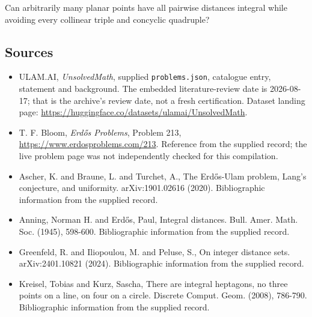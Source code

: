 \documentclass[11pt,a4paper]{article}
\begin{document}
Can arbitrarily many planar points have all pairwise distances integral while avoiding every collinear triple and concyclic quadruple?

\subsection{Sources}

{\small

\begin{itemize}

\item[\hypertarget{source:statement:1}{S1}] ULAM.AI, \emph{UnsolvedMath}, supplied \texttt{problems.json}, catalogue entry, statement and background. The embedded literature-review date is 2026-08-17; that is the archive’s review date, not a fresh certification. Dataset landing page: \url{https://huggingface.co/datasets/ulamai/UnsolvedMath}.

\item[\hypertarget{source:statement:2}{S2}] T. F. Bloom, \emph{Erdős Problems}, Problem 213, \url{https://www.erdosproblems.com/213}. Reference from the supplied record; the live problem page was not independently checked for this compilation.

\item[\hypertarget{source:statement:3}{S3}] Ascher, K. and Braune, L. and Turchet, A., The Erd\H{o}s-Ulam problem, Lang's conjecture, and uniformity. arXiv:1901.02616 (2020). Bibliographic information from the supplied record.

\item[\hypertarget{source:statement:4}{S4}] Anning, Norman H. and Erd\H{o}s, Paul, Integral distances. Bull. Amer. Math. Soc. (1945), 598-600. Bibliographic information from the supplied record.

\item[\hypertarget{source:statement:5}{S5}] Greenfeld, R. and Iliopoulou, M. and Peluse, S., On integer distance sets. arXiv:2401.10821 (2024). Bibliographic information from the supplied record.

\item[\hypertarget{source:statement:6}{S6}] Kreisel, Tobias and Kurz, Sascha, There are integral heptagons, no three points on a line, on four on a circle. Discrete Comput. Geom. (2008), 786-790. Bibliographic information from the supplied record.

\end{itemize}

}

\label{end:statement}
\end{document}
